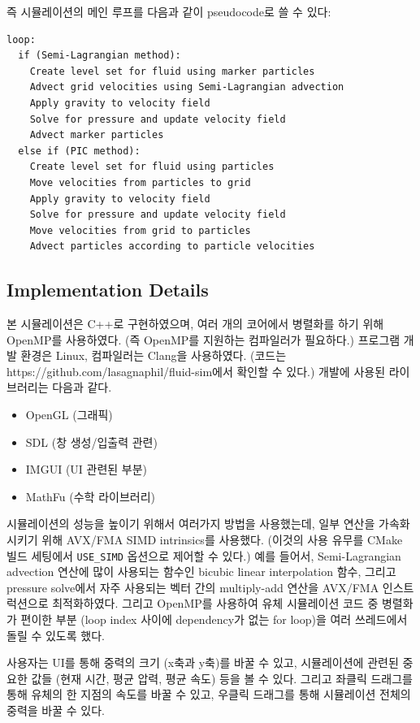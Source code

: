 \documentclass[12pt, A4]{article}
\begin{document}
즉 시뮬레이션의 메인 루프를 다음과 같이 pseudocode로 쓸 수 있다:

\begin{verbatim}
loop:
  if (Semi-Lagrangian method):
    Create level set for fluid using marker particles
    Advect grid velocities using Semi-Lagrangian advection 
    Apply gravity to velocity field
    Solve for pressure and update velocity field
    Advect marker particles
  else if (PIC method):
    Create level set for fluid using particles
    Move velocities from particles to grid
    Apply gravity to velocity field
    Solve for pressure and update velocity field
    Move velocities from grid to particles
    Advect particles according to particle velocities
\end{verbatim}

\subsection{Implementation Details}

본 시뮬레이션은 C++로 구현하였으며, 여러 개의 코어에서 병렬화를 하기 위해 OpenMP를 사용하였다. (즉 OpenMP를 지원하는 컴파일러가 필요하다.) 프로그램 개발 환경은 Linux, 컴파일러는 Clang을 사용하였다. (코드는 https://github.com/lasagnaphil/fluid-sim에서 확인할 수 있다.) 개발에 사용된 라이브러리는 다음과 같다.

\begin{itemize}
  \item OpenGL (그래픽)
  \item SDL (창 생성/입출력 관련)
  \item IMGUI (UI 관련된 부분)
  \item MathFu (수학 라이브러리)
\end{itemize}

시뮬레이션의 성능을 높이기 위해서 여러가지 방법을 사용했는데, 일부 연산을 가속화시키기 위해 AVX/FMA SIMD intrinsics를 사용했다. (이것의 사용 유무를 CMake 빌드 세팅에서 \texttt{USE\_SIMD} 옵션으로 제어할 수 있다.) 예를 들어서, Semi-Lagrangian advection 연산에 많이 사용되는 함수인 bicubic linear interpolation 함수, 그리고 pressure solve에서 자주 사용되는 벡터 간의 multiply-add 연산을 AVX/FMA 인스트럭션으로 최적화하였다.  그리고 OpenMP를 사용하여 유체 시뮬레이션 코드 중 병렬화가 편이한 부분 (loop index 사이에 dependency가 없는 for loop)을 여러 쓰레드에서 돌릴 수 있도록 했다.

사용자는 UI를 통해 중력의 크기 (x축과 y축)를 바꿀 수 있고, 시뮬레이션에 관련된 중요한 값들 (현재 시간, 평균 압력, 평균 속도) 등을 볼 수 있다. 그리고 좌클릭 드래그를 통해 유체의 한 지점의 속도를 바꿀 수 있고, 우클릭 드래그를 통해 시뮬레이션 전체의 중력을 바꿀 수 있다.
\end{document}
